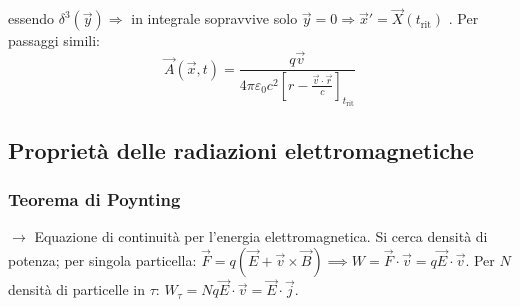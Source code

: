 \documentclass[10pt, a4paper]{scrartcl}
\numberwithin{equation}{subsection}
\theoremstyle{style1}
\begin{document}
essendo $\delta ^3(\vec{y}) \Rightarrow $ in integrale sopravvive solo $\vec{y}=0\Rightarrow \vec{x}' = \vec{X}(t_\text{rit})$ . Per passaggi simili:
\begin{equation}
	\vec{A}(\vec{x},t) = \frac{q\vec{v}}{4\pi \varepsilon _0 c^2 \left[ r - \frac{\vec{v}\cdot \vec{r}}{c} \right] _{t_\text{rit}} }
\end{equation}



















\subsection{Propriet\`a delle radiazioni elettromagnetiche}
\subsubsection{Teorema di Poynting}
$\to$ Equazione di continuit\`a per l'energia elettromagnetica. Si cerca densit\`a di potenza; per singola particella: $\vec{F}=q (\vec{E}+\vec{v}\times \vec{B})\implies W = \vec{F}\cdot \vec{v}= q \vec{E}\cdot \vec{v}$. Per $N$ densit\`a di particelle in $\tau $: $W_\tau  = Nq\vec{E}\cdot \vec{v} = \vec{E}\cdot \vec{j}$. 
\end{document}
